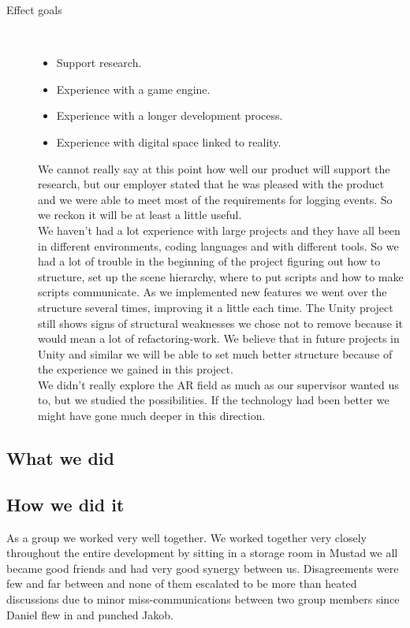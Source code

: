 \begin{description}
	\item[Effect goals]\ 
	\begin{itemize}
		\item Support research.
		\item Experience with a game engine.
		\item Experience with a longer development process.
		\item Experience with digital space linked to reality.
	\end{itemize}
	We cannot really say at this point how well our product will support the research, but our employer stated that he was pleased with the product and we were able to meet most of the requirements for logging events. 
	So we reckon it will be at least a little useful.\\
	We haven't had a lot experience with large projects and they have all been in different environments, coding languages and with different tools. 
	So we had a lot of trouble in the beginning of the project figuring out how to structure, set up the scene hierarchy, where to put scripts and how to make scripts communicate.
	As we implemented new features we went over the structure several times, improving it a little each time. 
	The Unity project still shows signs of structural weaknesses we chose not to remove because it would mean a lot of refactoring-work. 
	We believe that in future projects in Unity and similar we will be able to set much better structure because of the experience we gained in this project.\\
	We didn't really explore the AR field as much as our supervisor wanted us to, but we studied the possibilities. 
	If the technology had been better we might have gone much deeper in this direction.


\end{description}


\subsection{What we did}

\subsection{How we did it}
As a group we worked very well together.
We worked together very closely throughout the entire development by sitting in a storage room in Mustad we all became good friends and had very good synergy between us.
Disagreements were few and far between and none of them escalated to be more than heated discussions due to minor miss-communications between two group members since Daniel flew in and punched Jakob.

